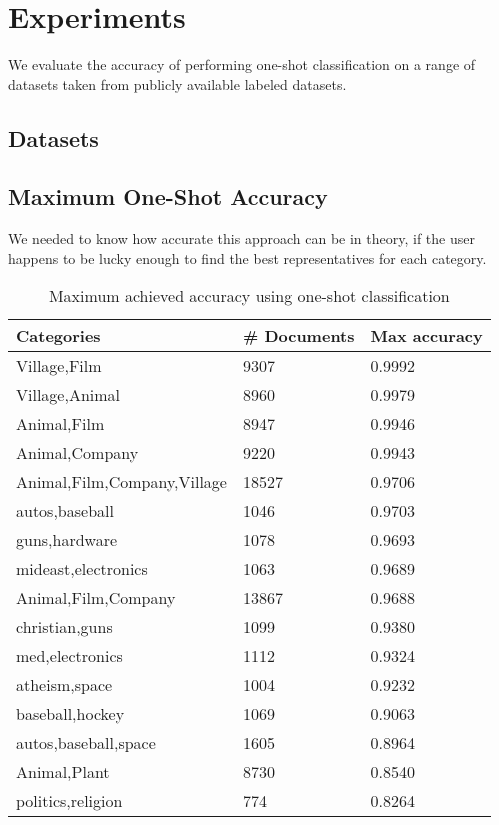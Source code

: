\section{Experiments}
We evaluate the accuracy of performing one-shot classification on a range of datasets taken from publicly available labeled datasets.

\subsection{Datasets}

\subsection{Maximum One-Shot Accuracy}
We needed to know how accurate this approach can be in theory, if the user happens to be lucky enough to find the best representatives for each category.

\begin{table}[]
\centering
\caption{Maximum achieved accuracy using one-shot classification}
\label{my-label}
\begin{tabular}{lll}
\toprule
Categories                  & \# Documents & Max accuracy \\
\midrule
Village,Film                & 9307         & 0.9992       \\
Village,Animal              & 8960         & 0.9979       \\
Animal,Film                 & 8947         & 0.9946       \\
Animal,Company              & 9220         & 0.9943       \\
Animal,Film,Company,Village & 18527        & 0.9706       \\
autos,baseball              & 1046         & 0.9703       \\
guns,hardware               & 1078         & 0.9693       \\
mideast,electronics         & 1063         & 0.9689       \\
Animal,Film,Company         & 13867        & 0.9688       \\
christian,guns              & 1099         & 0.9380       \\
med,electronics             & 1112         & 0.9324       \\
atheism,space               & 1004         & 0.9232       \\
baseball,hockey             & 1069         & 0.9063       \\
autos,baseball,space        & 1605         & 0.8964       \\
Animal,Plant                & 8730         & 0.8540       \\
politics,religion           & 774          & 0.8264      
\end{tabular}
\end{table}

